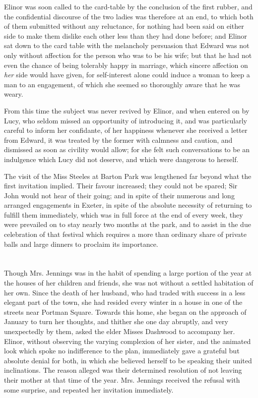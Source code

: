 Elinor was soon called to the card-table by the conclusion of the first rubber, and the confidential discourse of the two ladies was therefore at an end, to which both of them submitted without any reluctance, for nothing had been said on either side to make them dislike each other less than they had done before; and Elinor sat down to the card table with the melancholy persuasion that Edward was not only without affection for the person who was to be his wife; but that he had not even the chance of being tolerably happy in marriage, which sincere affection on {\em her} side would have given, for self-interest alone could induce a woman to keep a man to an engagement, of which she seemed so thoroughly aware that he was weary.

From this time the subject was never revived by Elinor, and when entered on by Lucy, who seldom missed an opportunity of introducing it, and was particularly careful to inform her confidante, of her happiness whenever she received a letter from Edward, it was treated by the former with calmness and caution, and dismissed as soon as civility would allow; for she felt such conversations to be an indulgence which Lucy did not deserve, and which were dangerous to herself.

The visit of the Miss Steeles at Barton Park was lengthened far beyond what the first invitation implied. Their favour increased; they could not be spared; Sir John would not hear of their going; and in spite of their numerous and long arranged engagements in Exeter, in spite of the absolute necessity of returning to fulfill them immediately, which was in full force at the end of every week, they were prevailed on to stay nearly two months at the park, and to assist in the due celebration of that festival which requires a more than ordinary share of private balls and large dinners to proclaim its importance.

\chapter{} %

Though Mrs. Jennings was in the habit of spending a large portion of the year at the houses of her children and friends, she was not without a settled habitation of her own. Since the death of her husband, who had traded with success in a less elegant part of the town, she had resided every winter in a house in one of the streets near Portman Square. Towards this home, she began on the approach of January to turn her thoughts, and thither she one day abruptly, and very unexpectedly by them, asked the elder Misses Dashwood to accompany her. Elinor, without observing the varying complexion of her sister, and the animated look which spoke no indifference to the plan, immediately gave a grateful but absolute denial for both, in which she believed herself to be speaking their united inclinations. The reason alleged was their determined resolution of not leaving their mother at that time of the year. Mrs. Jennings received the refusal with some surprise, and repeated her invitation immediately.

